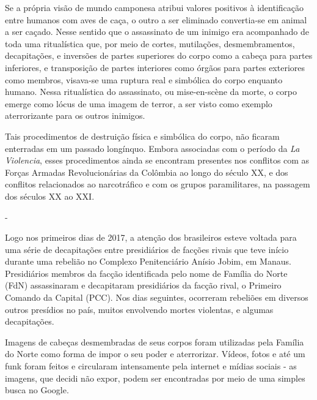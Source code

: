 Se a própria visão de mundo camponesa atribui valores positivos à
identificação entre humanos com aves de caça, o outro a ser eliminado
convertia-se em animal a ser caçado. Nesse sentido que o assassinato de
um inimigo era acompanhado de toda uma ritualística que, por meio de
cortes, mutilações, desmembramentos, decapitações, e inversões de partes
superiores do corpo como a cabeça para partes inferiores, e transposição
de partes interiores como órgãos para partes exteriores como membros,
visava-se uma ruptura real e simbólica do corpo enquanto humano. Nessa
ritualística do assassinato, ou mise-en-scène da morte, o corpo emerge
como lócus de uma imagem de terror, a ser visto como exemplo
aterrorizante para os outros inimigos.

Tais procedimentos de destruição física e simbólica do corpo, não
ficaram enterradas em um passado longínquo. Embora associadas com o
período da \emph{La Violencia}, esses procedimentos ainda se encontram
presentes nos conflitos com as Forças Armadas Revolucionárias da
Colômbia ao longo do século XX, e dos conflitos relacionados ao
narcotráfico e com os grupos paramilitares, na passagem dos séculos XX
ao XXI.

-

Logo nos primeiros dias de 2017, a atenção dos brasileiros esteve
voltada para uma série de decapitações entre presidiários de facções
rivais que teve início durante uma rebelião no Complexo Penitenciário
Anísio Jobim, em Manaus. Presidiários membros da facção identificada
pelo nome de Família do Norte (FdN) assassinaram e decapitaram
presidiários da facção rival, o Primeiro Comando da Capital (PCC). Nos
dias seguintes, ocorreram rebeliões em diversos outros presídios no
país, muitos envolvendo mortes violentas, e algumas decapitações.

Imagens de cabeças desmembradas de seus corpos foram utilizadas pela
Família do Norte como forma de impor o seu poder e aterrorizar. Vídeos,
fotos e até um funk foram feitos e circularam intensamente pela internet
e mídias sociais - as imagens, que decidi não expor, podem ser
encontradas por meio de uma simples busca no Google.

